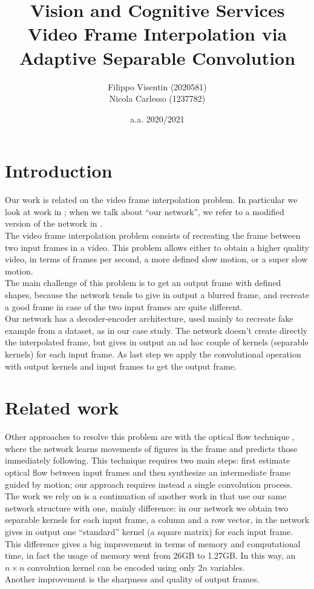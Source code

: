 \documentclass[11pt, a4paper]{article}
\title{Vision and Cognitive Services\\
\large Video Frame Interpolation via Adaptive Separable Convolution}
\author{Filippo Visentin (2020581)\\
Nicola Carlesso (1237782)}
\date{a.a. 2020/2021}
\begin{document}
	\maketitle
	\clearpage
	
	\tableofcontents
	\clearpage
	
	\section{Introduction}
	Our work is related on the video frame interpolation problem. In particular we look at work in \cite{mainpaper}; when we talk about ``our network'', we refer to a modified version of the network in \cite{mainpaper}.\\
	The video frame interpolation problem consists of recreating the frame between two input frames in a video. This problem allows either to obtain a higher quality video, in terms of frames per second, a more defined slow motion, or a super slow motion.\\
	The main challenge of this problem is to get an output frame with defined shapes, because the network tends to give in output a blurred frame, and recreate a good frame in case of the two input frames are quite different.\\
	Our network has a decoder-encoder architecture, used mainly to recreate fake example from a dataset, as in our case study. The network doesn't create directly the interpolated frame, but gives in output an ad hoc couple of kernels (separable kernels) for each input frame. As last step we apply the convolutional operation with output kernels and input frames to get the output frame. 
	
	\section{Related work}
	Other approaches to resolve this problem are with the optical flow technique \cite{optical_flow}, where the network learns movements of figures in the frame and predicts those immediately following. This technique requires two main steps: first estimate optical flow between input frames and then synthesize an intermediate frame guided by motion; our approach requires instead a single convolution process.\\
	The work we rely on is a continuation of another work in \cite{previous_work} that use our same network structure with one, mainly difference: in our network we obtain two separable kernels for each input frame, a column and a row vector, in \cite{previous_work} the network gives in output one ``standard'' kernel (a square matrix) for each input frame. This difference gives a big improvement in terms of memory and computational time, in fact the usage of memory went from 26GB to 1.27GB.  In this way, an $n \times n$ convolution kernel can be encoded using only $2n$ variables.\\
	Another improvement is the sharpness and quality of output frames.
	
\end{document}

